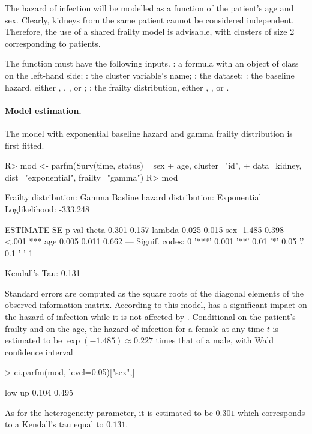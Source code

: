The hazard of infection will be modelled as a function of the patient's age and sex.
Clearly, kidneys from the same patient cannot be considered independent.
Therefore, the use of a shared frailty model is advisable, with clusters of size 2 corresponding to patients.

The  function must have the following inputs.
    : a formula with an object of class  on the left-hand side;
    : the cluster variable's name; 
    : the dataset;
    : the baseline hazard,
      either , , ,  or ;
    : the frailty distribution,
      either , ,  or .
  
\paragraph{Model estimation.}
The model with exponential baseline hazard and gamma frailty distribution is first fitted.

\begin{CodeChunk}
\begin{CodeInput}
R> mod <- parfm(Surv(time, status) ~ sex + age, cluster="id", 
+               data=kidney, dist="exponential", frailty="gamma")
R> mod
\end{CodeInput}
\begin{CodeOutput}
Frailty distribution: Gamma 
Basline hazard distribution: Exponential 
Loglikelihood: -333.248 

       ESTIMATE SE    p-val    
theta   0.301   0.157          
lambda  0.025   0.015          
sex    -1.485   0.398 <.001 ***
age     0.005   0.011 0.662    
---
Signif. codes: 0 '***' 0.001 '**' 0.01 '*' 0.05 '.' 0.1 ' ' 1

Kendall's Tau: 0.131 
\end{CodeOutput}
\end{CodeChunk}

Standard errors are computed as the square roots of the diagonal elements of the observed information matrix.
According to this model,  has a significant impact on the hazard of infection 
  while it is not affected by . 
Conditional on the patient's frailty and on the age, 
  the hazard of infection for a female at any time $t$ is estimated to be 
  $\exp(-1.485) \approx 0.227$ times that of a male,
  with Wald confidence interval  
\begin{CodeChunk}
\begin{CodeInput}
> ci.parfm(mod, level=0.05)["sex",]
\end{CodeInput}
\begin{CodeOutput}
  low    up 
0.104 0.495 
\end{CodeOutput}
\end{CodeChunk}
As for the heterogeneity parameter, it is estimated to be $0.301$ which corresponds to a Kendall's tau equal to $0.131$.

